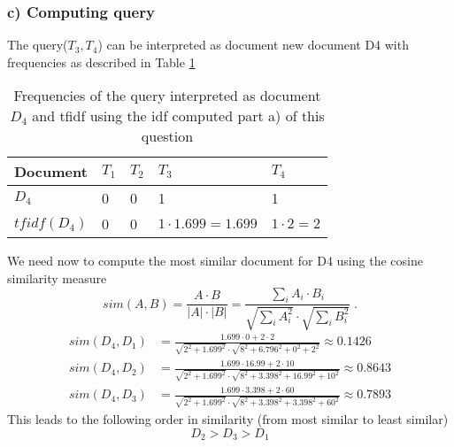 \documentclass[11pt]{article}
\begin{document}
\subsubsection*{c) Computing query}
The query($T_3, T_4$) can be interpreted as document new document D4 with frequencies
as described in Table \ref{D4}
\begin{table}[h]
\center
\begin{tabular}{|l|l|l|l|l|}
\hline
	Document & $T_1$ & $T_2$ & $T_3$ & $T_4$ \\ 
\hline
	$D_4$ & 0 & 0 & 1 & 1 \\ 
\hline
	$tfidf(D_4)$ & 0 & 0 & $1 \cdot 1.699 = 1.699$ & $1 \cdot 2 = 2$  \\ 
\hline
\end{tabular}
\caption{Frequencies of the query interpreted as document $D_4$ and 
tfidf using the idf computed part a) of this question}
\label{D4}
\end{table}
We need now to compute the most similar document for D4 using the cosine similarity measure
\begin{equation}
	sim(A,B) = \frac{A \cdot B}{|A| \cdot |B|} = \frac{\sum_i A_i \cdot B_i}{\sqrt{\sum_i A_i^2} \cdot \sqrt{\sum_i B_i^2}} \; . 
\end{equation}
\begin{align*}
	sim(D_4, D_1) &= \frac{1.699 \cdot 0 + 2 \cdot 2} 
					{\sqrt{2^2 + 1.699^2} \cdot \sqrt{8^2 + 6.796^2 + 0^2 + 2^2}} \approx 0.1426 \\
	sim(D_4, D_2) &= \frac{1.699 \cdot 16.99 + 2 \cdot 10}
					{\sqrt{2^2 + 1.699^2} \cdot \sqrt{8^2 + 3.398^2 + 16.99^2 + 10^2}} \approx 0.8643 \\
	sim(D_4, D_3) &= \frac{1.699 \cdot 3.398 + 2 \cdot 60}
					{\sqrt{2^2 + 1.699^2} \cdot \sqrt{8^2 + 3.398^2 + 3.398^2 + 60^2}} \approx 0.7893
\end{align*}
This leads to the following order in similarity (from most similar to least similar)
\begin{equation}
	D_2 > D_3 > D_1
\end{equation}
\end{document}
